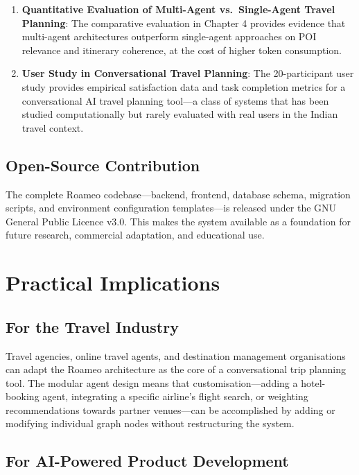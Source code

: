 \documentclass[12pt,a4paper]{report}
\begin{document}
\begin{enumerate}[nosep]
  \item \textbf{Quantitative Evaluation of Multi-Agent vs.\ Single-Agent Travel Planning}: The comparative evaluation in Chapter 4 provides evidence that multi-agent architectures outperform single-agent approaches on POI relevance and itinerary coherence, at the cost of higher token consumption.
  \item \textbf{User Study in Conversational Travel Planning}: The 20-participant user study provides empirical satisfaction data and task completion metrics for a conversational AI travel planning tool---a class of systems that has been studied computationally but rarely evaluated with real users in the Indian travel context.
\end{enumerate}

\subsection{Open-Source Contribution}

The complete Roameo codebase---backend, frontend, database schema, migration scripts, and environment configuration templates---is released under the GNU General Public Licence v3.0. This makes the system available as a foundation for future research, commercial adaptation, and educational use.

\section{Practical Implications}

\subsection{For the Travel Industry}

Travel agencies, online travel agents, and destination management organisations can adapt the Roameo architecture as the core of a conversational trip planning tool. The modular agent design means that customisation---adding a hotel-booking agent, integrating a specific airline's flight search, or weighting recommendations towards partner venues---can be accomplished by adding or modifying individual graph nodes without restructuring the system.

\subsection{For AI-Powered Product Development}
\end{document}
